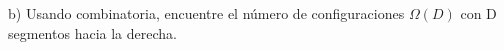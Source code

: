 b) Usando combinatoria, encuentre el número de configuraciones $\Omega(D)$ con $\mathrm{D}$ segmentos hacia la derecha.
